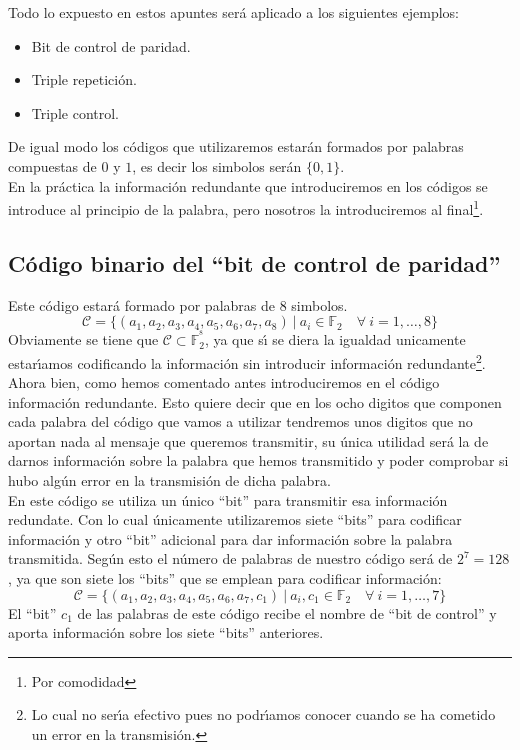 Todo lo expuesto en estos apuntes ser\'a aplicado a los siguientes ejemplos:
\begin{itemize}
\item Bit de control de paridad.
\item Triple repetici\'on.
\item Triple control.
\end{itemize}
De igual modo los c\'odigos que utilizaremos estar\'an formados por palabras
compuestas de $0$ y $1$, es decir los simbolos ser\'an $\{0,1\}$.\\

En la pr\'actica la informaci\'on redundante que introduciremos en los c\'odigos
se introduce al principio de la palabra, pero nosotros la introduciremos
al final\footnote{Por comodidad}.

\subsection{C\'odigo binario del ``bit de control de paridad''}

Este c\'odigo estar\'a formado por palabras de $8$ simbolos. 
\begin{displaymath}
\mathcal{C}=\{(a_1,a_2,a_3,a_4,a_5,a_6,a_7,a_8)\ |\ a_i\in \mathbb{F}_2\quad
\forall \ i=1,\dots,8\}
\end{displaymath}
Obviamente se tiene que $\mathcal{C} \subset \mathbb{F}^{^8}_2$, ya que s\'{\i}
se diera la igualdad unicamente estar\'{\i}amos codificando la informaci\'on sin
introducir informaci\'on redundante\footnote{Lo cual no ser\'{\i}a efectivo pues
no podr\'{\i}amos conocer cuando se ha cometido un error en la transmisi\'on.}.\\

Ahora bien, como hemos comentado antes introduciremos en el c\'odigo
informaci\'on redundante. Esto quiere decir que en los ocho digitos que componen
cada palabra del c\'odigo que vamos a utilizar tendremos unos digitos que no
aportan nada al mensaje que queremos transmitir, su \'unica utilidad ser\'a la
de darnos informaci\'on sobre la palabra que hemos transmitido y poder comprobar
si hubo alg\'un error en la transmisi\'on de dicha palabra.\\

En este c\'odigo se utiliza un \'unico ``bit'' para transmitir esa informaci\'on
redundate. Con lo cual \'unicamente utilizaremos siete ``bits'' para codificar
informaci\'on y otro ``bit'' adicional para dar informaci\'on sobre la palabra
transmitida. Seg\'un esto el n\'umero de palabras de nuestro c\'odigo ser\'a de
\mbox{$2^7=128$}, ya que son siete los ``bits'' que se emplean para codificar
informaci\'on:
\begin{displaymath}
\mathcal{C}=\{(a_1,a_2,a_3,a_4,a_5,a_6,a_7,c_1)\ |\ a_i,c_1\in\mathbb{F}_2\quad \forall \
i=1,\dots,7\}
\end{displaymath}
El ``bit'' $c_1$ de las palabras de este c\'odigo recibe el nombre de ``bit de
control'' y aporta informaci\'on sobre los siete ``bits'' anteriores.\\

